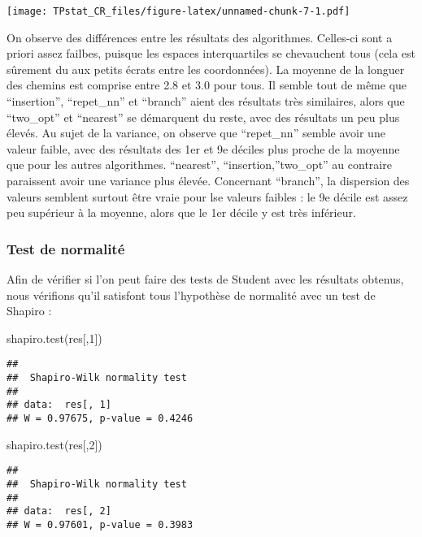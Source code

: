 \documentclass[
]{article}
\newenvironment{Shaded}{\begin{snugshade}}{\end{snugshade}}
\newcommand{\DecValTok}[1]{\textcolor[rgb]{0.00,0.00,0.81}{#1}}
\newcommand{\FunctionTok}[1]{\textcolor[rgb]{0.00,0.00,0.00}{#1}}
\newcommand{\NormalTok}[1]{#1}
\begin{document}
\texttt{[image: TPstat\_CR\_files/figure-latex/unnamed-chunk-7-1.pdf]}

On observe des différences entre les résultats des algorithmes.
Celles-ci sont a priori assez failbes, puisque les espaces
interquartiles se chevauchent tous (cela est sûrement du aux petits
écrats entre les coordonnées). La moyenne de la longuer des chemins est
comprise entre 2.8 et 3.0 pour tous. Il semble tout de même que
``insertion'', ``repet\_nn'' et ``branch'' aient des résultats très
similaires, alors que ``two\_opt'' et ``nearest'' se démarquent du
reste, avec des résultats un peu plus élevés. Au sujet de la variance,
on observe que ``repet\_nn'' semble avoir une valeur faible, avec des
résultats des 1er et 9e déciles plus proche de la moyenne que pour les
autres algorithmes. ``nearest'', ``insertion,''two\_opt'' au contraire
paraissent avoir une variance plus élevée. Concernant ``branch'', la
dispersion des valeurs semblent surtout être vraie pour lse valeurs
faibles : le 9e décile est assez peu supérieur à la moyenne, alors que
le 1er décile y est très inférieur.

\hypertarget{test-de-normalituxe9}{%
\subsubsection{Test de normalité}\label{test-de-normalituxe9}}

Afin de vérifier si l'on peut faire des tests de Student avec les
résultats obtenus, nous vérifions qu'il satisfont tous l'hypothèse de
normalité avec un test de Shapiro :

\begin{Shaded}
\begin{Highlighting}[]
\FunctionTok{shapiro.test}\NormalTok{(res[,}\DecValTok{1}\NormalTok{])}
\end{Highlighting}
\end{Shaded}

\begin{verbatim}
## 
##  Shapiro-Wilk normality test
## 
## data:  res[, 1]
## W = 0.97675, p-value = 0.4246
\end{verbatim}

\begin{Shaded}
\begin{Highlighting}[]
\FunctionTok{shapiro.test}\NormalTok{(res[,}\DecValTok{2}\NormalTok{])}
\end{Highlighting}
\end{Shaded}

\begin{verbatim}
## 
##  Shapiro-Wilk normality test
## 
## data:  res[, 2]
## W = 0.97601, p-value = 0.3983
\end{verbatim}
\end{document}
